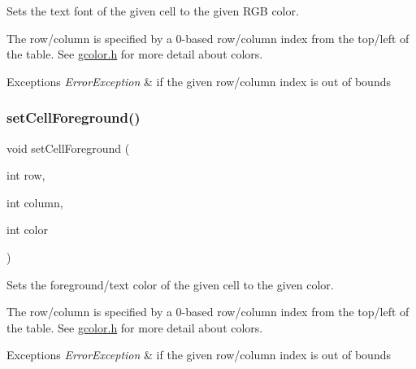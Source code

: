 Sets the text font of the given cell to the given R\+GB color. 

The row/column is specified by a 0-\/based row/column index from the top/left of the table. See \mbox{\hyperlink{gcolor_8h_source}{gcolor.\+h}} for more detail about colors. 
\begin{DoxyExceptions}{Exceptions}
{\em Error\+Exception} & if the given row/column index is out of bounds \\
\hline
\end{DoxyExceptions}
\mbox{\label{classsgl_1_1GTable_a19969b2f2b0cbf219333b02c047b2e7e}} 
\subsubsection{\texorpdfstring{set\+Cell\+Foreground()}{setCellForeground()}\hspace{0.1cm}{\footnotesize\ttfamily [1/2]}}
{\footnotesize\ttfamily void set\+Cell\+Foreground (\begin{DoxyParamCaption}\item[{int}]{row,  }\item[{int}]{column,  }\item[{int}]{color }\end{DoxyParamCaption})\hspace{0.3cm}{\ttfamily [virtual]}}



Sets the foreground/text color of the given cell to the given color. 

The row/column is specified by a 0-\/based row/column index from the top/left of the table. See \mbox{\hyperlink{gcolor_8h_source}{gcolor.\+h}} for more detail about colors. 
\begin{DoxyExceptions}{Exceptions}
{\em Error\+Exception} & if the given row/column index is out of bounds \\
\hline
\end{DoxyExceptions}
\mbox{\label{classsgl_1_1GTable_ab0bdc2afa7ef003fa5e8ab6eb25a7282}} 
